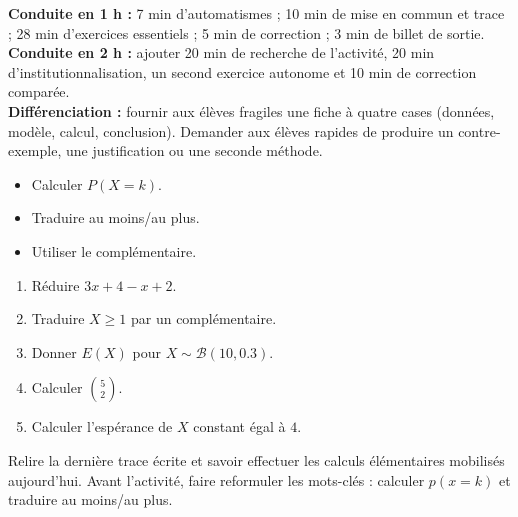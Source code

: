 \ifmxteacher
\begin{method}
\textbf{Conduite en 1 h :} 7 min d'automatismes ; 10 min de mise en commun et trace ; 28 min d'exercices essentiels ; 5 min de correction ; 3 min de billet de sortie.\\
\textbf{Conduite en 2 h :} ajouter 20 min de recherche de l'activité, 20 min d'institutionnalisation, un second exercice autonome et 10 min de correction comparée.\\
\textbf{Différenciation :} fournir aux élèves fragiles une fiche à quatre cases (données, modèle, calcul, conclusion). Demander aux élèves rapides de produire un contre-exemple, une justification ou une seconde méthode.
\end{method}
\fi
{}
\begin{objectives}\begin{itemize}\item Calculer $P(X=k)$.\item Traduire au moins/au plus.\item Utiliser le complémentaire.\end{itemize}\end{objectives}
\begin{fluency}\begin{enumerate}\item Réduire $3x+4-x+2$. \item Traduire $X\geq1$ par un complémentaire. \item Donner $E(X)$ pour $X\sim\mathcal B(10,\num{0,3})$. \item Calculer $\binom52$. \item Calculer l'espérance de $X$ constant égal à $4$. \end{enumerate}\end{fluency}
\begin{prerequisites}Relire la dernière trace écrite et savoir effectuer les calculs élémentaires mobilisés aujourd'hui. Avant l'activité, faire reformuler les mots-clés : calculer $p(x=k)$ et traduire au moins/au plus.\end{prerequisites}


